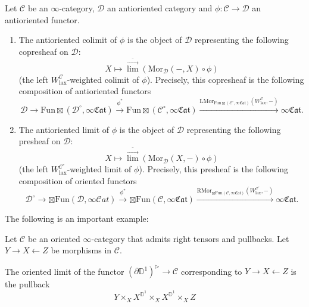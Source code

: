 \documentclass[10pt,oneside]{article}
\numberwithin{equation}{section} %
\numberwithin{figure}{section} %
\theoremstyle{plain}
\theoremstyle{definition}
\newcommand{\bD}{{\mathbb D}}
\newcommand{\mC}{{\mathcal C}}
\newcommand{\mD}{{\mathcal D}}
\renewcommand{\L}{{\mathrm L}}
\newcommand{\R}{{\mathrm R}}
\newcommand{\W}{W}
\newcommand{\Fun}{\mathrm{Fun}}
\newcommand{\lax}{{\mathrm{lax}}}
\newcommand{\Mor}{{\mathrm{Mor}}}
\newcommand{\scat}{\mathcal{C}\mathit{at}}
\begin{document}
\begin{definition}

Let $\mC$ be an $\infty$-category, $\mD$ an antioriented category  and $\phi: \mC \to \mD$ an antioriented functor. 

\begin{enumerate}[\normalfont(1)]\setlength{\itemsep}{-2pt}

\item The antioriented colimit of $\phi$ is the object of $\mD$ representing the following copresheaf on $\mD:$
$$ X \mapsto \overset{\bar{\to}}{\lim}(\mathrm{Mor}_\mD(-,X)\circ \phi)$$
(the left $\W^{\mC}_\lax$-weighted colimit of $\phi$).
Precisely, this copresheaf is the following composition of antioriented functors
$$ \mD \to {\Fun\boxtimes}(\mD^\circ,\infty\mathfrak{Cat}) \xrightarrow{\phi^*} {\Fun\boxtimes}(\mC^\circ,\infty\mathfrak{Cat}) \xrightarrow{\L\Mor_{\Fun\boxtimes(\mC^\circ,\infty\mathfrak{Cat})}(\W^{\mC}_\lax, -)} \infty\mathfrak{Cat}.$$

\item The antioriented limit of $\phi$ is the object of $\mD$ representing the following presheaf on $\mD:$
$$ X \mapsto \overset{\bar{\to}}{\lim}(\mathrm{Mor}_\mD(X,-)\circ \phi)$$
(the left $\W^{\mC^\circ}_\lax$-weighted limit of $\phi$).
Precisely, this presheaf is the following composition of oriented functors
$$ \mD^\circ \to {\boxtimes\Fun}(\mD,\infty\scat) \xrightarrow{\phi^*} {\boxtimes\Fun}(\mC,\infty\mathfrak{Cat}) \xrightarrow{\R\Mor_{\boxtimes\Fun(\mC,\infty\mathfrak{Cat})}(\W^{\mC^\circ}_\lax, -)} \infty\mathfrak{Cat}.$$

\end{enumerate}

\end{definition}

The following is an important example:

\begin{example}

Let $\mC$ be an oriented $\infty$-category that admits right tensors and pullbacks.
Let $Y \to X \leftarrow Z$ be morphisms in $\mC.$

The oriented limit of the functor $(\partial\bD^1)^{\triangleright} \to \mC $
corresponding to $Y \to X \leftarrow Z$ is the pullback
$$Y  \times_{X} X^{\bD^1} \times_{X} X^{\bD^1} \times_{X} Z $$
    
\end{example}
\end{document}
